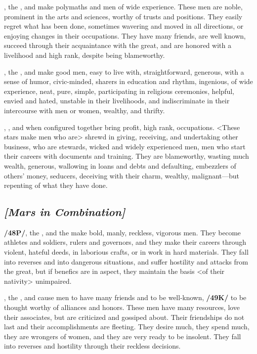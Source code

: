 \Mercury, the \Sun, and \Venus\xspace make polymaths and men of wide experience. These men are noble, prominent in the arts and sciences, worthy of trusts and positions. They easily regret what has been done, sometimes wavering and moved in all directions, or enjoying changes in their occupations. They have many friends, are well known, succeed through their acquaintance with the great, and are honored with a livelihood and high rank, despite being blameworthy.

\Mercury, the \Moon, and \Venus\xspace make good men, easy to live with, straightforward, generous, with a sense of humor, civic-minded, sharers in education and rhythm, ingenious, of wide experience, neat, pure, simple, participating in religious ceremonies, helpful, envied and hated, unstable in their livelihoods, and indiscriminate in their intercourse with men or women, wealthy, and thrifty.

\Mercury, \Mars, and \Venus\xspace when configured together bring profit, high rank, occupations. <These stars make men who are> shrewd in giving, receiving, and undertaking other business, who are stewards, wicked and widely experienced men, men who start their careers with documents and training. They are blameworthy, wasting much wealth, generous, wallowing in loans and debts and defaulting, embezzlers of others’ money, seducers, deceiving with their charm, wealthy, malignant—but repenting of what they have done.

\secbr
\subsection{\textit{[Mars in Combination]}}
\textbf{/48P/}\Mars, the \Sun, and the \Moon\xspace make bold, manly, reckless, vigorous men. They become athletes and soldiers, rulers and governors, and they make their careers through violent, hateful deeds, in laborious crafts, or in work in hard materials. They fall into reverses and into dangerous situations, and suffer hostility and attacks from the great, but if benefics are in aspect, they maintain the basis <of their nativity> unimpaired.

\Mars, the \Sun, and \Venus\xspace cause men to have many friends and to be well-known, \textbf{/49K/} to be thought
worthy of alliances and honors. These men have many resources, love their associates, but are criticized and gossiped about. Their friendships do not last and their accomplishments are fleeting. They desire much, they spend much, they are wrongers of women, and they are very ready to be insolent. They fall
into reverses and hostility through their reckless decisions.

